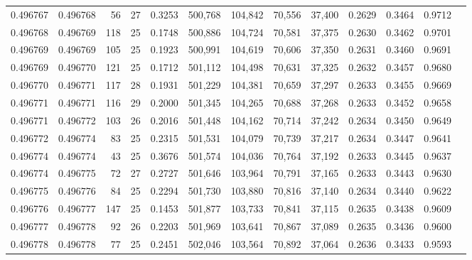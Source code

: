 \begin{tabular}{rrrrrrrrrrrrr}
0.496767 & 0.496768 &  56 &  27 &                                     0.3253 & 500,768 & 104,842 &  70,556 &  37,400 & 0.2629 & 0.3464 & 0.9712 \\
0.496768 & 0.496769 & 118 &  25 &                                     0.1748 & 500,886 & 104,724 &  70,581 &  37,375 & 0.2630 & 0.3462 & 0.9701 \\
0.496769 & 0.496769 & 105 &  25 &                                     0.1923 & 500,991 & 104,619 &  70,606 &  37,350 & 0.2631 & 0.3460 & 0.9691 \\
0.496769 & 0.496770 & 121 &  25 &                                     0.1712 & 501,112 & 104,498 &  70,631 &  37,325 & 0.2632 & 0.3457 & 0.9680 \\
0.496770 & 0.496771 & 117 &  28 &                                     0.1931 & 501,229 & 104,381 &  70,659 &  37,297 & 0.2633 & 0.3455 & 0.9669 \\
0.496771 & 0.496771 & 116 &  29 &                                     0.2000 & 501,345 & 104,265 &  70,688 &  37,268 & 0.2633 & 0.3452 & 0.9658 \\
0.496771 & 0.496772 & 103 &  26 &                                     0.2016 & 501,448 & 104,162 &  70,714 &  37,242 & 0.2634 & 0.3450 & 0.9649 \\
0.496772 & 0.496774 &  83 &  25 &                                     0.2315 & 501,531 & 104,079 &  70,739 &  37,217 & 0.2634 & 0.3447 & 0.9641 \\
0.496774 & 0.496774 &  43 &  25 &                                     0.3676 & 501,574 & 104,036 &  70,764 &  37,192 & 0.2633 & 0.3445 & 0.9637 \\
0.496774 & 0.496775 &  72 &  27 &                                     0.2727 & 501,646 & 103,964 &  70,791 &  37,165 & 0.2633 & 0.3443 & 0.9630 \\
0.496775 & 0.496776 &  84 &  25 &                                     0.2294 & 501,730 & 103,880 &  70,816 &  37,140 & 0.2634 & 0.3440 & 0.9622 \\
0.496776 & 0.496777 & 147 &  25 &                                     0.1453 & 501,877 & 103,733 &  70,841 &  37,115 & 0.2635 & 0.3438 & 0.9609 \\
0.496777 & 0.496778 &  92 &  26 &                                     0.2203 & 501,969 & 103,641 &  70,867 &  37,089 & 0.2635 & 0.3436 & 0.9600 \\
0.496778 & 0.496778 &  77 &  25 &                                     0.2451 & 502,046 & 103,564 &  70,892 &  37,064 & 0.2636 & 0.3433 & 0.9593 \\

\end{tabular}
